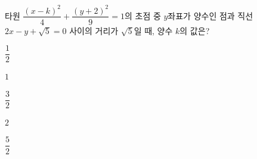 타원 $\dfrac{(x-k)^2}{4}+\dfrac{(y+2)^2}{9}=1$의 초점 중 $y$좌표가 양수인 점과 직선 $2x-y+\sqrt{5}=0$ 사이의 거리가 $\sqrt{5}$일 때, 양수 $k$의 값은?
\begin{choices32}{\rule[-3ex]{0pt}{8ex}$\dfrac{1}{2}$}{\rule[-3ex]{0pt}{8ex}$1$}{\rule[-3ex]{0pt}{8ex}$\dfrac{3}{2}$}{\rule[-3ex]{0pt}{8ex}$2$}{\rule[-3ex]{0pt}{8ex}$\dfrac{5}{2}$}\end{choices32}
